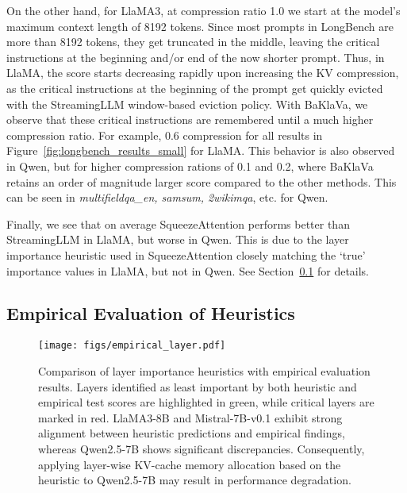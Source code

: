On the other hand, for LlaMA3, at compression ratio 1.0 we start at the model's maximum context length of 8192 tokens. Since most prompts in LongBench are more than 8192 tokens, they get truncated in the middle, leaving the critical instructions at the beginning and/or end of the now shorter prompt. Thus, in LlaMA, the score starts decreasing rapidly upon increasing the KV compression, as the critical instructions at the beginning of the prompt get quickly evicted with the StreamingLLM window-based eviction policy. With BaKlaVa, we observe that these critical instructions are remembered until a much higher compression ratio. For example, 0.6 compression for all results in Figure~\ref{fig:longbench_results_small} for LlaMA. This behavior is also observed in Qwen, but for higher compression rations of 0.1 and 0.2, where BaKlaVa retains an order of magnitude larger score compared to the other methods. This can be seen in \textit{multifieldqa\_en, samsum, 2wikimqa}, etc. for Qwen. 

Finally, we see that on average SqueezeAttention performs better than StreamingLLM in LlaMA, but worse in Qwen. This is due to the layer importance heuristic used in SqueezeAttention closely matching the `true' importance values in LlaMA, but not in Qwen. See Section~\ref{sec:empirical_results} for details.


\subsection{Empirical Evaluation of Heuristics}
\label{sec:empirical_results}


\begin{figure}
    \centering
    \texttt{[image: figs/empirical\_layer.pdf]}
    \caption{Comparison of layer importance heuristics with empirical evaluation results. Layers identified as least important by both heuristic and empirical test scores are highlighted in green, while critical layers are marked in red. LlaMA3-8B and Mistral-7B-v0.1 exhibit strong alignment between heuristic predictions and empirical findings, whereas Qwen2.5-7B shows significant discrepancies. Consequently, applying layer-wise KV-cache memory allocation based on the heuristic to Qwen2.5-7B may result in performance degradation.}
    \label{fig:empirical_layer_results}
\end{figure}



